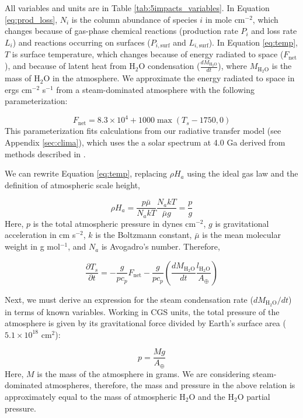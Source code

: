 All variables and units are in Table \ref{tab:5impacts_variables}. In Equation \eqref{eq:prod_loss}, $N_i$ is the column abundance of species $i$ in mole cm$^{-2}$, which changes because of gas-phase chemical reactions (production rate $P_i$ and loss rate $L_i$) and reactions occurring on surfaces ($P_{i,\text{surf}}$ and $L_{i,\text{surf}}$). In Equation \eqref{eq:temp}, $T$ is surface temperature, which changes because of energy radiated to space ($F_\text{net}$), and because of latent heat from H$_2$O condensation ($\frac{d M_\mathrm{H_2O}}{dt}$), where $M_\mathrm{H_2O}$ is the mass of H$_2$O in the atmosphere. We approximate the energy radiated to space in ergs cm$^{-2}$ s$^{-1}$ from a steam-dominated atmosphere with the following parameterization:

\begin{equation}
  F_\text{net} = 8.3 \times 10^4 + 1000 \max(T_s - 1750,0)
\end{equation}
This parameterization fits calculations from our radiative transfer model (see Appendix \ref{sec:clima}), which uses the a solar spectrum at 4.0 Ga derived from methods described in \citet{Claire_2012}. 

We can rewrite Equation \eqref{eq:temp}, replacing $\rho H_a$ using the ideal gas law and the definition of atmospheric scale height,

\begin{equation}
  \rho H_a = \frac{p \bar\mu}{N_a k T} \frac{N_a k T}{\bar\mu g} = \frac{p}{g}
\end{equation}
Here, $p$ is the total atmospheric pressure in dynes cm$^{-2}$, $g$ is gravitational acceleration in cm s$^{-2}$, $k$ is the Boltzmann constant, $\bar\mu$ is the mean molecular weight in g mol$^{-1}$, and $N_a$ is Avogadro's number. Therefore,

\begin{equation} \label{eq:temp0}
  \frac{\partial T_s}{\partial t} = -\frac{g}{p c_p} F_\text{net} - \frac{g}{p c_p}\left(\frac{d M_\mathrm{H_2O}}{dt} \frac{l_\mathrm{H_2O}}{A_\oplus}\right) 
\end{equation}

Next, we must derive an expression for the steam condensation rate ($d M_\mathrm{H_2O}/dt$) in terms of known variables. Working in CGS units, the total pressure of the atmosphere is given by its gravitational force divided by Earth's surface area ($5.1 \times 10^{18}$ cm$^2$):

\begin{equation}
 p = \frac{Mg}{A_\oplus}
\end{equation}
Here, $M$ is the mass of the atmosphere in grams. We are considering steam-dominated atmospheres, therefore, the mass and pressure in the above relation is approximately equal to the mass of atmospheric H$_2$O and the H$_2$O partial pressure.

